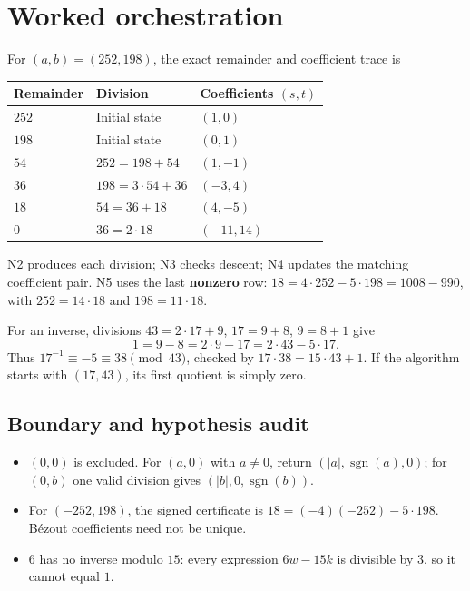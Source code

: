 \documentclass[preprint,12pt,aps,pra,showkeys,amsmath,amssymb,superscriptaddress,floatfix]{revtex4-2}
\theoremstyle{definition}
\theoremstyle{remark}
\begin{document}
\section{Worked orchestration}

For \((a,b)=(252,198)\), the exact remainder and coefficient trace is

\begin{longtable}[]{@{}lll@{}}
\toprule\noalign{}
Remainder & Division & Coefficients \((s,t)\) \\
\midrule\noalign{}
\endhead
\bottomrule\noalign{}
\endlastfoot
\(252\) & Initial state & \((1,0)\) \\
\(198\) & Initial state & \((0,1)\) \\
\(54\) & \(252=198+54\) & \((1,-1)\) \\
\(36\) & \(198=3\cdot54+36\) & \((-3,4)\) \\
\(18\) & \(54=36+18\) & \((4,-5)\) \\
\(0\) & \(36=2\cdot18\) & \((-11,14)\) \\
\end{longtable}

N2 produces each division; N3 checks descent; N4 updates the matching
coefficient pair. N5 uses the last \textbf{nonzero} row:
\(18=4\cdot252-5\cdot198=1008-990\), with \(252=14\cdot18\) and
\(198=11\cdot18\).

For an inverse, divisions \(43=2\cdot17+9\), \(17=9+8\), \(9=8+1\) give
\[1=9-8=2\cdot9-17=2\cdot43-5\cdot17.\] Thus
\(17^{-1}\equiv-5\equiv38\pmod{43}\), checked by
\(17\cdot38=15\cdot43+1\). If the algorithm starts with \((17,43)\), its
first quotient is simply zero.

\subsection{Boundary and hypothesis audit}

\begin{itemize}
\item
  \((0,0)\) is excluded. For \((a,0)\) with \(a\ne0\), return
  \((|a|,\operatorname{sgn}(a),0)\); for \((0,b)\) one valid division
  gives \((|b|,0,\operatorname{sgn}(b))\).
\item
  For \((-252,198)\), the signed certificate is
  \(18=(-4)(-252)-5\cdot198\). Bézout coefficients need not be unique.
\item
  \(6\) has no inverse modulo \(15\): every expression \(6w-15k\) is
  divisible by \(3\), so it cannot equal \(1\).
\end{itemize}
\end{document}
